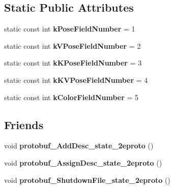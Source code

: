 \subsection*{Static Public Attributes}
\begin{DoxyCompactItemize}
\item 
static const int {\bfseries k\+Pose\+Field\+Number} = 1\hypertarget{classvss__state_1_1Robot__State_a06e3140dd78f55d44314911855a3fe81}{}\label{classvss__state_1_1Robot__State_a06e3140dd78f55d44314911855a3fe81}

\item 
static const int {\bfseries k\+V\+Pose\+Field\+Number} = 2\hypertarget{classvss__state_1_1Robot__State_aa6dfdfba7f7196572fc98034331e6909}{}\label{classvss__state_1_1Robot__State_aa6dfdfba7f7196572fc98034331e6909}

\item 
static const int {\bfseries k\+K\+Pose\+Field\+Number} = 3\hypertarget{classvss__state_1_1Robot__State_ae9b978f27b1c1b69a48d75ebf32ef4f4}{}\label{classvss__state_1_1Robot__State_ae9b978f27b1c1b69a48d75ebf32ef4f4}

\item 
static const int {\bfseries k\+K\+V\+Pose\+Field\+Number} = 4\hypertarget{classvss__state_1_1Robot__State_abc59194083bbc5b0aed20ad2516828bb}{}\label{classvss__state_1_1Robot__State_abc59194083bbc5b0aed20ad2516828bb}

\item 
static const int {\bfseries k\+Color\+Field\+Number} = 5\hypertarget{classvss__state_1_1Robot__State_a941074e9004ce28bc7cddfd36aeacb43}{}\label{classvss__state_1_1Robot__State_a941074e9004ce28bc7cddfd36aeacb43}

\end{DoxyCompactItemize}
\subsection*{Friends}
\begin{DoxyCompactItemize}
\item 
void {\bfseries protobuf\+\_\+\+Add\+Desc\+\_\+state\+\_\+2eproto} ()\hypertarget{classvss__state_1_1Robot__State_aab1a2c258f8122a403a979ff57e2a706}{}\label{classvss__state_1_1Robot__State_aab1a2c258f8122a403a979ff57e2a706}

\item 
void {\bfseries protobuf\+\_\+\+Assign\+Desc\+\_\+state\+\_\+2eproto} ()\hypertarget{classvss__state_1_1Robot__State_a57d9367bc8a7a94ead11d11194cca1b6}{}\label{classvss__state_1_1Robot__State_a57d9367bc8a7a94ead11d11194cca1b6}

\item 
void {\bfseries protobuf\+\_\+\+Shutdown\+File\+\_\+state\+\_\+2eproto} ()\hypertarget{classvss__state_1_1Robot__State_a4e6dc5e8e72799859c4e9556d090e57d}{}\label{classvss__state_1_1Robot__State_a4e6dc5e8e72799859c4e9556d090e57d}

\end{DoxyCompactItemize}


